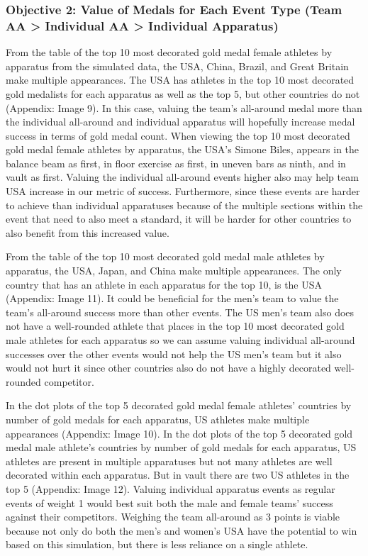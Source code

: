 \documentclass[
  10.5pt,
  letterpaper,
  DIV=11,
  numbers=noendperiod]{scrartcl}
\begin{document}
\hypertarget{objective-2-value-of-medals-for-each-event-type-team-aa-individual-aa-individual-apparatus}{%
\subsubsection{Objective 2: Value of Medals for Each Event Type (Team AA
\textgreater{} Individual AA \textgreater{} Individual
Apparatus)}\label{objective-2-value-of-medals-for-each-event-type-team-aa-individual-aa-individual-apparatus}}

From the table of the top 10 most decorated gold medal female athletes
by apparatus from the simulated data, the USA, China, Brazil, and Great
Britain make multiple appearances. The USA has athletes in the top 10
most decorated gold medalists for each apparatus as well as the top 5,
but other countries do not (Appendix: Image 9). In this case, valuing
the team's all-around medal more than the individual all-around and
individual apparatus will hopefully increase medal success in terms of
gold medal count. When viewing the top 10 most decorated gold medal
female athletes by apparatus, the USA's Simone Biles, appears in the
balance beam as first, in floor exercise as first, in uneven bars as
ninth, and in vault as first. Valuing the individual all-around events
higher also may help team USA increase in our metric of success.
Furthermore, since these events are harder to achieve than individual
apparatuses because of the multiple sections within the event that need
to also meet a standard, it will be harder for other countries to also
benefit from this increased value.

From the table of the top 10 most decorated gold medal male athletes by
apparatus, the USA, Japan, and China make multiple appearances. The only
country that has an athlete in each apparatus for the top 10, is the USA
(Appendix: Image 11). It could be beneficial for the men's team to value
the team's all-around success more than other events. The US men's team
also does not have a well-rounded athlete that places in the top 10 most
decorated gold male athletes for each apparatus so we can assume valuing
individual all-around successes over the other events would not help the
US men's team but it also would not hurt it since other countries also
do not have a highly decorated well-rounded competitor.

In the dot plots of the top 5 decorated gold medal female athletes'
countries by number of gold medals for each apparatus, US athletes make
multiple appearances (Appendix: Image 10). In the dot plots of the top 5
decorated gold medal male athlete's countries by number of gold medals
for each apparatus, US athletes are present in multiple apparatuses but
not many athletes are well decorated within each apparatus. But in vault
there are two US athletes in the top 5 (Appendix: Image 12). Valuing
individual apparatus events as regular events of weight 1 would best
suit both the male and female teams' success against their competitors.
Weighing the team all-around as 3 points is viable because not only do
both the men's and women's USA have the potential to win based on this
simulation, but there is less reliance on a single athlete.
\end{document}

